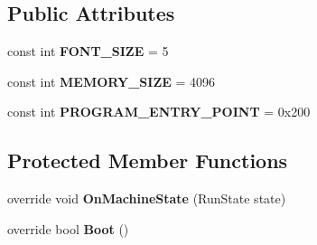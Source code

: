 \subsection*{Public Attributes}
\begin{DoxyCompactItemize}
\item 
\hypertarget{class_eimu_1_1_core_1_1_systems_1_1_s_chip8_1_1_s_chip_machine_a798c8d015cab624ff0b478318dc04fad}{
const int {\bfseries FONT\_\-SIZE} = 5}
\label{class_eimu_1_1_core_1_1_systems_1_1_s_chip8_1_1_s_chip_machine_a798c8d015cab624ff0b478318dc04fad}

\item 
\hypertarget{class_eimu_1_1_core_1_1_systems_1_1_s_chip8_1_1_s_chip_machine_a195414fac20da1b42123f526b15219d3}{
const int {\bfseries MEMORY\_\-SIZE} = 4096}
\label{class_eimu_1_1_core_1_1_systems_1_1_s_chip8_1_1_s_chip_machine_a195414fac20da1b42123f526b15219d3}

\item 
\hypertarget{class_eimu_1_1_core_1_1_systems_1_1_s_chip8_1_1_s_chip_machine_ad24c3fe6254c9869acfd856651009a8b}{
const int {\bfseries PROGRAM\_\-ENTRY\_\-POINT} = 0x200}
\label{class_eimu_1_1_core_1_1_systems_1_1_s_chip8_1_1_s_chip_machine_ad24c3fe6254c9869acfd856651009a8b}

\end{DoxyCompactItemize}
\subsection*{Protected Member Functions}
\begin{DoxyCompactItemize}
\item 
\hypertarget{class_eimu_1_1_core_1_1_systems_1_1_s_chip8_1_1_s_chip_machine_a6526d25de5fb4f57e73e80a404a5f2e7}{
override void {\bfseries OnMachineState} (RunState state)}
\label{class_eimu_1_1_core_1_1_systems_1_1_s_chip8_1_1_s_chip_machine_a6526d25de5fb4f57e73e80a404a5f2e7}

\item 
\hypertarget{class_eimu_1_1_core_1_1_systems_1_1_s_chip8_1_1_s_chip_machine_aca397ce02e5befdf1c5871f2b873be34}{
override bool {\bfseries Boot} ()}
\label{class_eimu_1_1_core_1_1_systems_1_1_s_chip8_1_1_s_chip_machine_aca397ce02e5befdf1c5871f2b873be34}

\end{DoxyCompactItemize}
